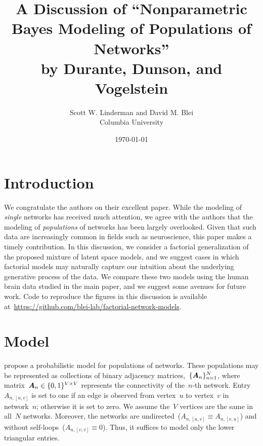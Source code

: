 



\title{A Discussion of ``Nonparametric Bayes Modeling of Populations of Networks''\\
by Durante, Dunson, and Vogelstein}
\author{
  Scott W. Linderman and David M. Blei\\
  Columbia University
}
\date{\today}


\maketitle


\section{Introduction}

We congratulate the authors on their excellent paper.  While the
modeling of \emph{single} networks has received much attention, we agree
with the authors that the modeling of \emph{populations} of
networks has been largely overlooked.  Given that such data are
increasingly common in fields such as neuroscience, this paper makes a
timely contribution.  In this discussion, we consider a factorial
generalization of the proposed mixture of latent space models,
and we suggest cases in which factorial
models may naturally capture our intuition about the
underlying generative process of the data. We compare these two models using the
human brain data studied in the main paper, and we suggest some
avenues for future work.  Code to reproduce the figures in this
discussion is available
at~\url{https://github.com/blei-lab/factorial-network-models}.

\section{Model}
\citet{durante2016nonparametric}
propose a probabilistic model for populations of networks. These populations
may be represented as collections of binary adjacency matrices,~$\{\boldsymbol{A}_n\}_{n=1}^N$,
where matrix~${\boldsymbol{A}_n \in \{0,1\}^{V \times V}}$ represents the
connectivity of the~$n$-th network.  Entry~${A_{n,[u,v]}}$ is set to
one if an edge is observed from vertex~$u$ to vertex~$v$ in
network~$n$; otherwise it is set to zero.  We assume the~$V$ vertices
are the same in all~$N$ networks.  Moreover, the networks are
undirected~(${A_{n,[u,v]} \equiv A_{n,[v,u]}}$) and without
self-loops~(${A_{n,[v,v]} \equiv 0}$). Thus, it suffices to model only
the lower triangular entries.

